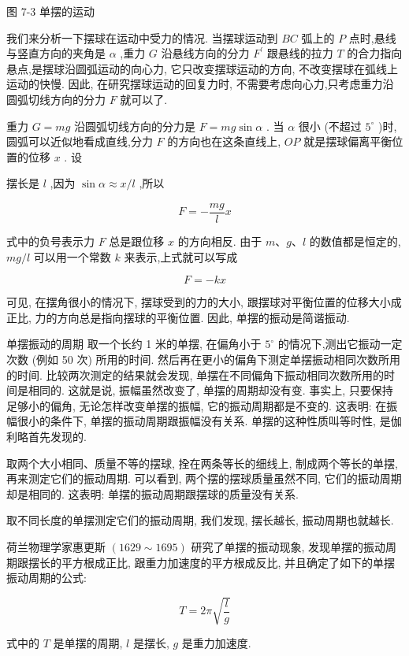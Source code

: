 \documentclass[10pt]{article}
\begin{document}
图 7-3 单摆的运动

我们来分析一下摆球在运动中受力的情况. 当摆球运动到 \({BC}\) 弧上的 \(P\) 点时,悬线与竖直方向的夹角是 \(\alpha\) ,重力 \(G\) 沿悬线方向的分力 \({F}^{\prime }\) 跟悬线的拉力 \(T\) 的合力指向悬点,是摆球沿圆弧运动的向心力, 它只改变摆球运动的方向, 不改变摆球在弧线上运动的快慢. 因此, 在研究摆球运动的回复力时, 不需要考虑向心力,只考虑重力沿圆弧切线方向的分力 \(F\) 就可以了.

重力 \(G = {mg}\) 沿圆弧切线方向的分力是 \(F = {mg}\sin \alpha\) . 当 \(\alpha\) 很小 (不超过 \({5}^{ \circ }\) )时,圆弧可以近似地看成直线,分力 \(F\) 的方向也在这条直线上, \({OP}\) 就是摆球偏离平衡位置的位移 \(x\) . 设

摆长是 \(l\) ,因为 \(\sin \alpha \approx x/l\) ,所以

\[
F = - \frac{mg}{l}x
\]

式中的负号表示力 \(F\) 总是跟位移 \(x\) 的方向相反. 由于 \(m\text{、}g\text{、}l\) 的数值都是恒定的, \({mg}/l\) 可以用一个常数 \(k\) 来表示,上式就可以写成

\[
F = - {kx}
\]

可见, 在摆角很小的情况下, 摆球受到的力的大小, 跟摆球对平衡位置的位移大小成正比, 力的方向总是指向摆球的平衡位置. 因此, 单摆的振动是简谐振动.

单摆振动的周期 取一个长约 1 米的单摆, 在偏角小于 \({5}^{ \circ }\) 的情况下,测出它振动一定次数 (例如 50 次) 所用的时间. 然后再在更小的偏角下测定单摆振动相同次数所用的时间. 比较两次测定的结果就会发现, 单摆在不同偏角下振动相同次数所用的时间是相同的. 这就是说, 振幅虽然改变了, 单摆的周期却没有变. 事实上, 只要保持足够小的偏角, 无论怎样改变单摆的振幅, 它的振动周期都是不变的. 这表明: 在振幅很小的条件下, 单摆的振动周期跟振幅没有关系. 单摆的这种性质叫等时性, 是伽利略首先发现的.

取两个大小相同、质量不等的摆球, 拴在两条等长的细线上, 制成两个等长的单摆, 再来测定它们的振动周期. 可以看到, 两个摆的摆球质量虽然不同, 它们的振动周期却是相同的. 这表明: 单摆的振动周期跟摆球的质量没有关系.

取不同长度的单摆测定它们的振动周期, 我们发现, 摆长越长, 振动周期也就越长.

荷兰物理学家惠更斯 \(\left( {{1629} \sim {1695}}\right)\) 研究了单摆的振动现象, 发现单摆的振动周期跟摆长的平方根成正比, 跟重力加速度的平方根成反比, 并且确定了如下的单摆振动周期的公式:

\[
T = {2\pi }\sqrt{\frac{l}{g}}
\]

式中的 \(T\) 是单摆的周期, \(l\) 是摆长, \(g\) 是重力加速度.
\end{document}
